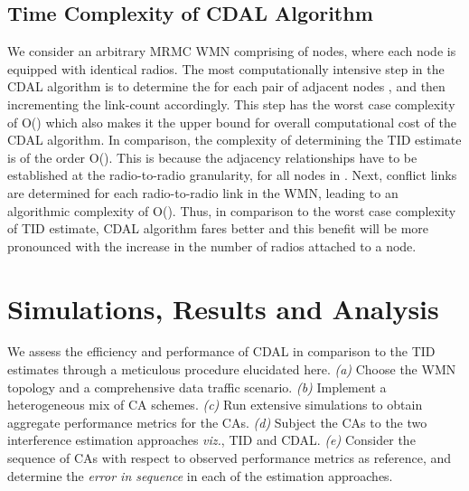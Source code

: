 \documentclass[conference]{IEEEtran}
\begin{document}
\subsection{Time Complexity of CDAL Algorithm}

We consider an arbitrary MRMC WMN  comprising of  nodes, where each node is equipped with  identical radios. The most computationally intensive step in the CDAL algorithm is to determine the  for each pair of adjacent nodes , and then incrementing the link-count accordingly. This step has the worst case complexity of O() which also makes it the upper bound for overall computational cost of the CDAL algorithm. In comparison, the complexity of determining the TID estimate is of the order O(). This is because the adjacency relationships have to be established at the radio-to-radio granularity, for all nodes in . Next, conflict links are determined for each radio-to-radio link in the WMN, leading to an algorithmic complexity of O(). 
Thus, in comparison to the worst case complexity of TID estimate, CDAL algorithm fares better and this benefit will be more pronounced with the increase in the number of radios attached to a node.

\section{Simulations, Results and Analysis}
We assess the efficiency and performance of CDAL in comparison to the TID estimates through a meticulous procedure elucidated here. \textit{(a)} Choose the WMN topology and a comprehensive data traffic scenario. \textit{(b)} Implement a heterogeneous mix of CA schemes. \textit{(c)} Run extensive simulations to obtain aggregate performance metrics for the CAs. \textit{(d)} Subject the CAs to the two interference estimation approaches \emph{viz.}, TID and CDAL. \textit{(e)} Consider the sequence of CAs with respect to observed performance metrics as reference, and determine the \textit{error in sequence} in each of the estimation approaches.
\end{document}
